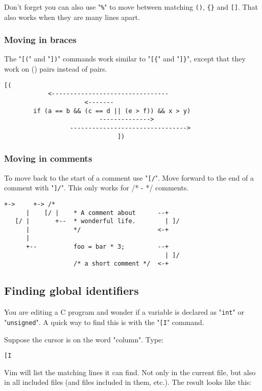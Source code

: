 Don't forget you can also use "\verb!%!" to move between matching \verb!()!, \verb!{}! and \verb![]!.
That also works when they are many lines apart.
\subsubsection{Moving in braces}
The "\verb![(!" and "\verb!])!" commands work similar to "\verb![{!" and "\verb!]}!", except that they work on () pairs instead of {} pairs.

\begin{Verbatim}[samepage=true]
                          [(
            <--------------------------------
                      <-------
        if (a == b && (c == d || (e > f)) && x > y) 
                          -------------->
                  -------------------------------->
                               ])
\end{Verbatim}

\subsubsection{Moving in comments}
To move back to the start of a comment use "\verb![/!".
Move forward to the end of a comment with "\verb!]/!".
This only works for /* - */ comments.

\begin{Verbatim}[samepage=true]
      +->     +-> /*
      |    [/ |    * A comment about      --+
   [/ |       +--  * wonderful life.        | ]/
      |            */                     <-+
      |
      +--          foo = bar * 3;         --+
                                            | ]/
                   /* a short comment */  <-+
\end{Verbatim}
\subsection{Finding global identifiers}
You are editing a C program and wonder if a variable is declared as "\verb!int!" or "\verb!unsigned!".
A quick way to find this is with the "\verb![I!" command.

Suppose the cursor is on the word "column".
Type:

\begin{Verbatim}[samepage=true]
 [I
\end{Verbatim}

Vim will list the matching lines it can find.
Not only in the current file, but also in all included files (and files included in them, etc.).
The result looks like this:

